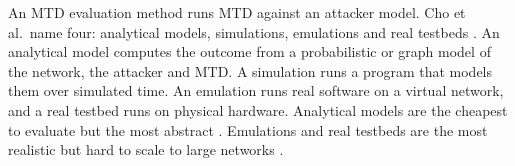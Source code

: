\documentclass{cshonours}
\begin{document}
An MTD evaluation method runs MTD against an attacker model. Cho et al.\
name four: analytical models, simulations, emulations and real testbeds
\citep{cho2020}. An analytical model computes the outcome
from a probabilistic or graph model of the network, the attacker and MTD.
A simulation runs a program that models them over simulated time. An
emulation runs real software on a virtual network, and a real testbed runs
on physical hardware. Analytical models are the cheapest to evaluate but
the most abstract \citep{cho2020}. Emulations and real testbeds are the
most realistic but hard to scale to large networks \citep{cho2020}.
\end{document}
